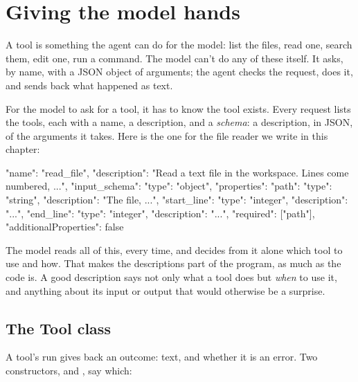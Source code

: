 \chapter{Giving the model hands}\label{ch:tools}

A tool is something the agent can do for the model: list the files, read
one, search them, edit one, run a command. The model can't do any of
these itself. It asks, by name, with a JSON object of arguments; the agent
checks the request, does it, and sends back what happened as text.

For the model to ask for a tool, it has to know the tool exists. Every
request lists the tools, each with a name, a description, and a
\emph{schema}: a description, in JSON, of the arguments it takes. Here is
the one for the file reader we write in this chapter:

\begin{json}
{"name": "read_file",
 "description": "Read a text file in the workspace. Lines come numbered, ...",
 "input_schema": {"type": "object",
                  "properties": {"path": {"type": "string", "description": "The file, ..."},
                                 "start_line": {"type": "integer", "description": "..."},
                                 "end_line": {"type": "integer", "description": "..."}},
                  "required": ["path"],
                  "additionalProperties": false}}
\end{json}

The model reads all of this, every time, and decides from it alone which
tool to use and how. That makes the descriptions part of the program, as
much as the code is. A good description says not only what a tool does but
\emph{when} to use it, and anything about its input or output that would
otherwise be a surprise.

\section{The Tool class}

A tool's run gives back an outcome: text, and whether it is an error. Two
constructors,  and , say which:

